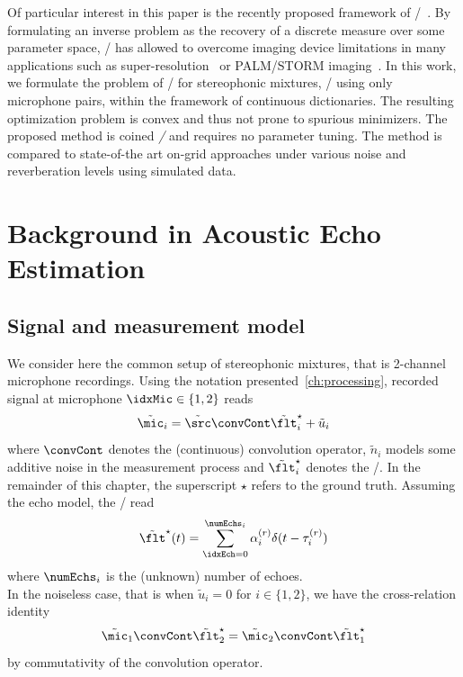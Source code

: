 \mynewline
Of particular interest in this paper is the recently proposed framework of \CDdef/~.
By formulating an inverse problem as the recovery of a discrete measure over some parameter space, \CD/ has allowed to overcome imaging device limitations in many applications such as super-resolution~ or PALM/STORM imaging~.
In this work, we formulate the problem of \AER/ for stereophonic mixtures, \ie/ using only microphone pairs, within the framework of continuous dictionaries.
The resulting optimization problem is convex and thus not prone to spurious minimizers.
The proposed method is coined \emph{\BLASTERdef/} and requires no parameter tuning.
The method is compared to state-of-the art on-grid approaches under various noise and reverberation levels using simulated data.


\section{Background in Acoustic Echo Estimation}\label{sec:blaster:background}

\subsection{Signal and measurement model}
We consider here the common setup of stereophonic mixtures, that is 2-channel microphone recordings.
Using the notation presented~\cref{ch:processing}, recorded signal at microphone $\idxMic\in\{1,2\}$ reads
\begin{equation}
    \label{eq:blaster:recordedSignal}
    \tilde{\mic}_i = \tilde{\src} \convCont \tilde{\flt}_i^\star + \tilde{u}_i
\end{equation}
where $\convCont$ denotes the (continuous) convolution operator, $\tilde{n}_i$ models some additive noise in the measurement process and $\tilde{\flt}_i^\star$ denotes the \RIRdef/.
In the remainder of this chapter, the superscript $\star$ refers to the ground truth.
Assuming the echo model, the \RIRs/ read
\begin{equation}
    \label{eq:blaster:def_filter_star}
    \tilde{\flt}^\star(t) = \sum_{\idxEch=0}^{\numEchs_i} \alpha_i^{(r)} \delta(t - \tau_i^{(r)})
\end{equation}
where $\numEchs_i$ is the (unknown) number of echoes.
\\In the noiseless case, that is when $\tilde{u}_i = 0$ for $i\in\{1,2\}$, we have the cross-relation identity
\begin{equation} \label{eq:blaster:cross-relation}
    \tilde{\mic}_1 \convCont \tilde{\flt}_2^\star = \tilde{\mic}_2 \convCont \tilde{\flt}_1^\star
\end{equation}
by commutativity of the convolution operator.

